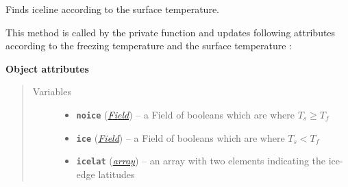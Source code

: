 \documentclass[letterpaper,10pt,english]{sphinxmanual}
\begin{document}
\begin{fulllineitems}
\begin{quote}
\begin{description}
\begin{itemize}
\end{itemize}

\end{description}\end{quote}

\begin{fulllineitems}
\label{api/climlab.surface:climlab.surface.albedo.Iceline.find_icelines}
Finds iceline according to the surface temperature.

This method is called by the private function 
and updates following attributes according to the freezing temperature
 and the surface temperature :

\textbf{Object attributes}
\begin{quote}\begin{description}
\item[{Variables}] \leavevmode\begin{itemize}
\item {} 
\textbf{\texttt{noice}} ({\hyperref[api/climlab.domain:climlab.domain.field.Field]{\emph{\emph{Field}}}}) -- a Field of booleans which are  where
\(T_s \ge T_f\)

\item {} 
\textbf{\texttt{ice}} ({\hyperref[api/climlab.domain:climlab.domain.field.Field]{\emph{\emph{Field}}}}) -- a Field of booleans which are  where
\(T_s < T_f\)

\item {} 
\textbf{\texttt{icelat}} (\href{http://docs.python.org/2.7/library/array.html\#module-array}{\emph{array}}) -- an array with two elements indicating the 
ice-edge latitudes

\end{itemize}

\end{description}\end{quote}

\end{fulllineitems}


\end{fulllineitems}

\end{document}
